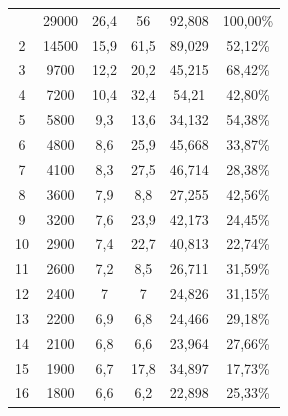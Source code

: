 \begin{longtable}{cccccc}
  \bottomrule
  \endlastfoot
  1           & 29000                & 26,4          & 56             & 92,808        & 100,00\%                           \\
  2           & 14500                & 15,9          & 61,5           & 89,029        & 52,12\%                            \\
  3           & 9700                 & 12,2          & 20,2           & 45,215        & 68,42\%                            \\
  4           & 7200                 & 10,4          & 32,4           & 54,21         & 42,80\%                            \\
  5           & 5800                 & 9,3           & 13,6           & 34,132        & 54,38\%                            \\
  6           & 4800                 & 8,6           & 25,9           & 45,668        & 33,87\%                            \\
  7           & 4100                 & 8,3           & 27,5           & 46,714        & 28,38\%                            \\
  8           & 3600                 & 7,9           & 8,8            & 27,255        & 42,56\%                            \\
  9           & 3200                 & 7,6           & 23,9           & 42,173        & 24,45\%                            \\
  10          & 2900                 & 7,4           & 22,7           & 40,813        & 22,74\%                            \\
  11          & 2600                 & 7,2           & 8,5            & 26,711        & 31,59\%                            \\
  12          & 2400                 & 7             & 7              & 24,826        & 31,15\%                            \\
  13          & 2200                 & 6,9           & 6,8            & 24,466        & 29,18\%                            \\
  14          & 2100                 & 6,8           & 6,6            & 23,964        & 27,66\%                            \\
  15          & 1900                 & 6,7           & 17,8           & 34,897        & 17,73\%                            \\
  16          & 1800                 & 6,6           & 6,2            & 22,898        & 25,33\%                            \\

\end{longtable}
